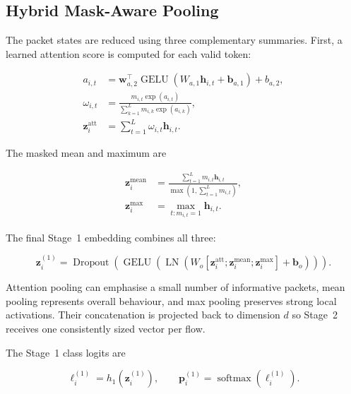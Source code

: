 \documentclass[11pt,fleqn]{report}
\begin{document}
\subsection{Hybrid Mask-Aware Pooling}
\label{subsubsec:hybrid_pooling}

The packet states are reduced using three complementary summaries. First, a learned attention score is computed for each valid token:

\begin{align}
    a_{i,t}
    &=\mathbf{w}_{a,2}^{\top}
      \operatorname{GELU}
      \left(W_{a,1}\mathbf{h}_{i,t}+\mathbf{b}_{a,1}\right)+b_{a,2},\\
    \omega_{i,t}
    &=\frac{m_{i,t}\exp(a_{i,t})}
      {\sum_{k=1}^{L}m_{i,k}\exp(a_{i,k})},\\
    \mathbf{z}^{\mathrm{att}}_i
    &=\sum_{t=1}^{L}\omega_{i,t}\mathbf{h}_{i,t}.
    \label{eq:stage1_attention_pooling}
\end{align}

The masked mean and maximum are

\begin{align}
    \mathbf{z}^{\mathrm{mean}}_i
    &=\frac{\sum_{t=1}^{L}m_{i,t}\mathbf{h}_{i,t}}
            {\max(1,\sum_{t=1}^{L}m_{i,t})},\\
    \mathbf{z}^{\mathrm{max}}_i
    &=\max_{t:m_{i,t}=1}\mathbf{h}_{i,t}.
    \label{eq:mean_max_pooling}
\end{align}

The final Stage~1 embedding combines all three:

\begin{equation}
    \mathbf{z}^{(1)}_i
    =\operatorname{Dropout}
      \left(
        \operatorname{GELU}
        \left(
          \operatorname{LN}
          \left(
            W_o
            [\mathbf{z}^{\mathrm{att}}_i;
             \mathbf{z}^{\mathrm{mean}}_i;
             \mathbf{z}^{\mathrm{max}}_i]
            +\mathbf{b}_o
          \right)
        \right)
      \right).
    \label{eq:hybrid_pooling}
\end{equation}

Attention pooling can emphasise a small number of informative packets, mean pooling represents overall behaviour, and max pooling preserves strong local activations. Their concatenation is projected back to dimension $d$ so Stage~2 receives one consistently sized vector per flow.

The Stage~1 class logits are

\begin{equation}
    \boldsymbol{\ell}^{(1)}_i
    =h_1(\mathbf{z}^{(1)}_i),
    \qquad
    \mathbf{p}^{(1)}_i
    =\operatorname{softmax}(\boldsymbol{\ell}^{(1)}_i).
    \label{eq:stage1_classifier}
\end{equation}
\end{document}
